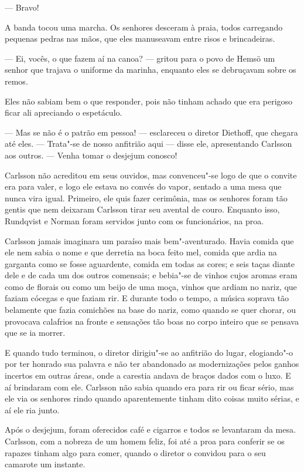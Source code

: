 --- Bravo!

A banda tocou uma marcha. Os senhores desceram à praia, todos carregando
pequenas pedras nas mãos, que eles manuseavam entre risos e brincadeiras.

--- Ei, vocês, o que fazem aí na canoa? --- gritou para o povo de Hemsö um senhor
que trajava o uniforme da marinha, enquanto eles se debruçavam sobre os remos.

Eles não sabiam bem o que responder, pois não tinham achado que era perigoso
ficar ali apreciando o espetáculo.

--- Mas se não é o patrão em pessoa! --- esclareceu o diretor Diethoff, que
chegara até eles. --- Trata"-se de nosso anfitrião aqui --- disse ele, apresentando
Carlsson aos outros. --- Venha tomar o desjejum conosco!

Carlsson não acreditou em seus ouvidos, mas convenceu"-se logo de que o convite era
para valer, e logo ele estava no convés do vapor, sentado a uma mesa que nunca
vira igual. Primeiro, ele quis fazer cerimônia, mas os senhores foram tão gentis
que nem deixaram Carlsson tirar seu avental de couro. Enquanto isso, Rundqvist e
Norman foram servidos junto com os funcionários, na proa.

Carlsson jamais imaginara um paraíso mais bem"-aventurado. Havia comida que ele nem
sabia o nome e que derretia na boca feito mel, comida que ardia na garganta como
se fosse aguardente, comida em todas as cores; e seis taças diante dele e de
cada um dos outros comensais; e bebia"-se de vinhos cujos aromas eram como de
florais ou como um beijo de uma moça, vinhos que ardiam no nariz, que faziam
cócegas e que faziam rir. E durante todo o tempo, a música soprava tão belamente
que fazia comichões na base do nariz, como quando se quer chorar, ou provocava
calafrios na fronte e sensações tão boas no corpo inteiro que se pensava que se ia morrer. 

E quando tudo terminou, o diretor dirigiu"-se ao anfitrião do
lugar, elogiando"-o por ter honrado sua palavra e não ter abandonado as
modernizações pelos ganhos incertos em outras áreas, onde a carestia andava de
braços dados com o luxo. E aí brindaram com ele. Carlsson não sabia quando era
para rir ou ficar sério, mas ele via os senhores rindo quando aparentemente
tinham dito coisas muito sérias, e aí ele ria junto. 

Após o desjejum, foram oferecidos café e cigarros e todos se levantaram da mesa. Carlsson, com a
nobreza de um homem feliz, foi até a proa para conferir se os rapazes tinham algo para
comer, quando o diretor o convidou para o seu camarote um instante. 

